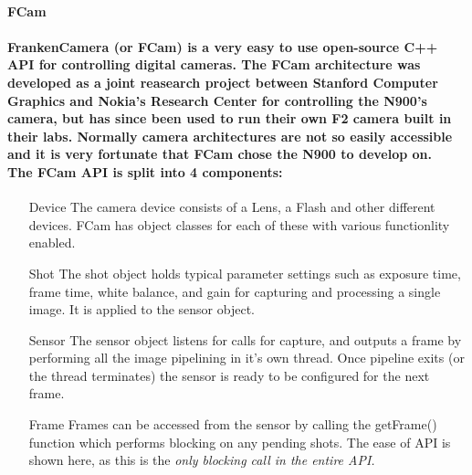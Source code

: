 \documentclass[11pt]{article} %
\begin{document}
\paragraph{\bf{FCam}}
\paragraph{FrankenCamera (or FCam) is a very easy to use open-source C++ API for controlling digital cameras.  The FCam architecture was developed as a joint reasearch project between Stanford Computer Graphics and Nokia's Research Center for controlling the N900's camera, but has since been used to run their own F2 camera built in their labs\cite{fcamdoc}. Normally camera architectures are not so easily accessible and it is very fortunate that FCam chose the N900 to develop on.
\\The FCam API is split into 4 components:}
\begin{enumerate}
\item[Device]{The camera device consists of a Lens, a Flash and other different devices. FCam has object classes for each of these with various functionlity enabled.}
\item[Shot]{The shot object holds typical parameter settings such as exposure time, frame time, white balance, and gain for capturing and processing a single image. It is applied to the sensor object.}
\item[Sensor]{The sensor object listens for calls for capture, and outputs a frame by performing all the image pipelining in it's own thread. Once pipeline exits (or the thread terminates) the sensor is ready to be configured for the next frame.}
\item[Frame]{Frames can be accessed from the sensor by calling the getFrame() function which performs blocking on any pending shots. The ease of API is shown here, as this is the \it{only} blocking call in the entire API.}
\end{enumerate}
\end{document}
